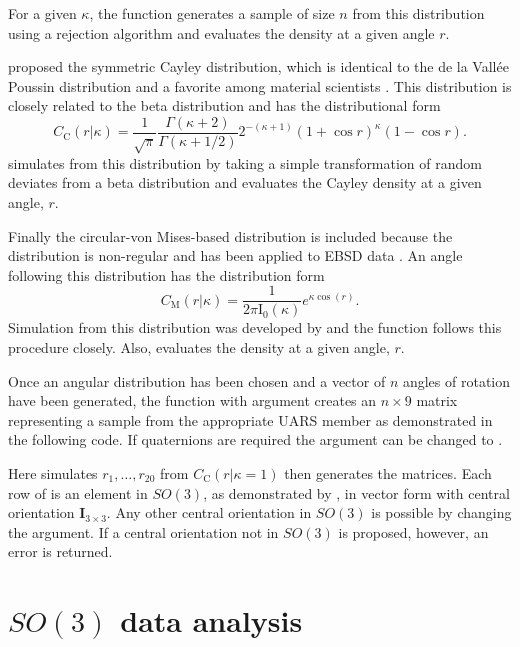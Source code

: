 For a given $\kappa$, the function  generates a sample of size $n$ from this distribution using a rejection algorithm and  evaluates the density at a given angle $r$.

\citet{leon2006} proposed the symmetric Cayley distribution, which is identical to the de la Vall\'{e}e Poussin distribution and a favorite among material scientists \citep{Schaeben1997}.  This distribution is closely related to the beta distribution and has the distributional form
\[
C_\mathrm{C}(r |\kappa)=\frac{1}{\sqrt{\pi}} \frac{\Gamma(\kappa+2)}{\Gamma(\kappa+1/2)}2^{-(\kappa+1)}(1+\cos r)^\kappa(1-\cos r).
\]
 simulates from this distribution by taking a simple transformation of random deviates from a beta distribution and  evaluates the Cayley density at a given angle, $r$.

Finally the circular-von Mises-based distribution is included because the distribution is non-regular and has been applied to EBSD data \citep{bingham2009}.  An angle following this distribution has the distribution form
\[
C_\mathrm{M}(r|\kappa)=\frac{1}{2\pi \mathrm{I_0}(\kappa)}e^{\kappa\cos(r)}.
\]
Simulation from this distribution was developed by \citet{best1979} and the function  follows this procedure closely.  Also,  evaluates the density at a given angle, $r$.

Once an angular distribution has been chosen and a vector of $n$ angles of rotation have been generated, the  function with argument  creates an $n\times 9$ matrix representing a sample from the appropriate UARS member as demonstrated in the following code.  If quaternions are required the argument  can be changed to .


Here  simulates $r_1,\ldots,r_{20}$ from  $C_\mathrm{C}(r |\kappa=1)$ then  generates the matrices.  Each row of  is an element in $SO(3)$, as demonstrated by , in vector form with central orientation $\bm I_{3\times 3}$.  Any other central orientation in $SO(3)$ is possible by changing the  argument.  If a central orientation not in $SO(3)$ is proposed, however, an error is returned.

\section{$SO(3)$ data analysis\label{section:analysis}}

